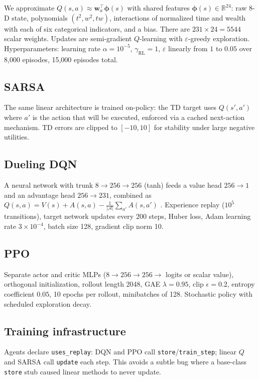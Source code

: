 \documentclass[11pt,a4paper]{article}
\begin{document}
We approximate $Q(s,a) \approx \mathbf{w}_a^\top \boldsymbol{\phi}(s)$ with shared features $\boldsymbol{\phi}(s) \in \mathbb{R}^{24}$: raw 8-D state, polynomials $(t^2, w^2, tw)$, interactions of normalized time and wealth with each of six categorical indicators, and a bias. There are $231\times 24 = 5544$ scalar weights. Updates are semi-gradient $Q$-learning with $\varepsilon$-greedy exploration. Hyperparameters: learning rate $\alpha=10^{-5}$, $\gamma_{\mathrm{RL}}=1$, $\varepsilon$ linearly from $1$ to $0.05$ over 8{,}000 episodes, 15{,}000 episodes total.

\subsection{SARSA}

The same linear architecture is trained on-policy: the TD target uses $Q(s',a')$ where $a'$ is the action that will be executed, enforced via a cached next-action mechanism. TD errors are clipped to $[-10,10]$ for stability under large negative utilities.

\subsection{Dueling DQN}

A neural network with trunk $8\to 256 \to 256$ (tanh) feeds a value head $256\to 1$ and an advantage head $256\to 231$, combined as $Q(s,a)=V(s)+A(s,a)-\frac{1}{|\mathcal{A}|}\sum_{a'}A(s,a')$ \citep{wang2016dueling}. Experience replay ($10^5$ transitions), target network updates every 200 steps, Huber loss, Adam learning rate $3\times 10^{-4}$, batch size 128, gradient clip norm 10.

\subsection{PPO}

Separate actor and critic MLPs ($8\to 256\to 256\to$ logits or scalar value), orthogonal initialization, rollout length 2048, GAE $\lambda=0.95$, clip $\epsilon=0.2$, entropy coefficient $0.05$, 10 epochs per rollout, minibatches of 128. Stochastic policy with scheduled exploration decay.

\subsection{Training infrastructure}

Agents declare \texttt{uses\_replay}: DQN and PPO call \texttt{store}/\texttt{train\_step}; linear $Q$ and SARSA call \texttt{update} each step. This avoids a subtle bug where a base-class \texttt{store} stub caused linear methods to never update.
\end{document}
